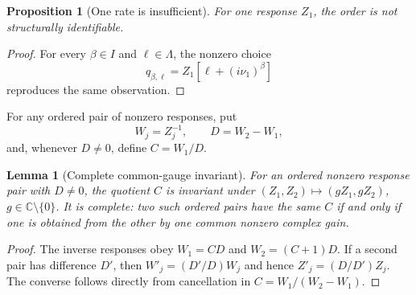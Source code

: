 \documentclass[11pt]{article}
\newtheorem{proposition}[theorem]{Proposition}
\newtheorem{lemma}[theorem]{Lemma}
\theoremstyle{definition}
\theoremstyle{remark}
\newcommand{\C}{\mathbb C}
\begin{document}
\begin{proposition}[One rate is insufficient]
For one response \(Z_1\), the order is not structurally identifiable.
\end{proposition}
\begin{proof}
For every \(\beta\in I\) and \(\ell\in\Lambda\), the nonzero choice
\[
 q_{\beta,\ell}=Z_1[\ell+(i\nu_1)^\beta]
\]
reproduces the same observation.
\end{proof}

For any ordered pair of nonzero responses, put
\[
 W_j=Z_j^{-1},\qquad D=W_2-W_1,
\]
and, whenever \(D\ne0\), define \(C=W_1/D\).

\begin{lemma}[Complete common-gauge invariant]
\label{lem:gauge}
For an ordered nonzero response pair with \(D\ne0\), the quotient \(C\) is
invariant under \((Z_1,Z_2)\mapsto(gZ_1,gZ_2)\), \(g\in\C\setminus\{0\}\).
It is complete: two such ordered pairs have the same \(C\) if and only if one
is obtained from the other by one common nonzero complex gain.
\end{lemma}
\begin{proof}
The inverse responses obey \(W_1=CD\) and \(W_2=(C+1)D\).  If a second pair
has difference \(D'\), then \(W'_j=(D'/D)W_j\) and hence
\(Z'_j=(D/D')Z_j\).  The converse follows directly from cancellation in
\(C=W_1/(W_2-W_1)\).
\end{proof}
\end{document}
